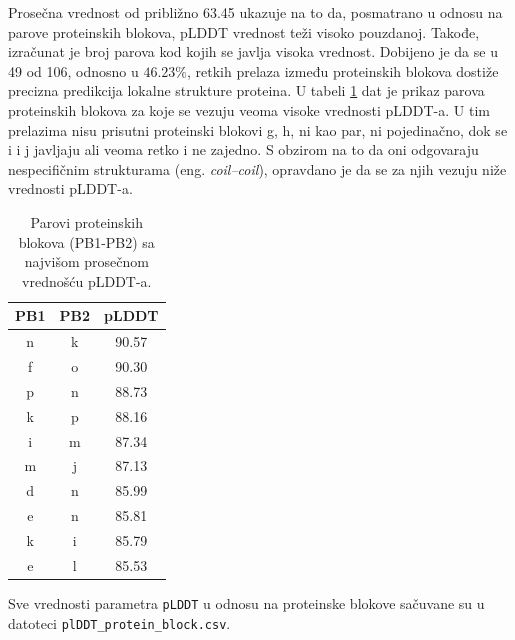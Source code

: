 \documentclass[a4paper,12pt]{article}
\begin{document}
Prosečna vrednost od približno 63.45 ukazuje na to da, posmatrano u odnosu na parove proteinskih blokova, pLDDT vrednost teži visoko pouzdanoj. Takođe, izračunat je broj parova kod kojih se javlja visoka vrednost. Dobijeno je da se u 49 od 106, odnosno u $46.23\%$, retkih prelaza između proteinskih blokova dostiže precizna predikcija lokalne strukture proteina. U tabeli \ref{Tabela:6} dat je prikaz parova proteinskih blokova za koje se vezuju veoma visoke vrednosti pLDDT-a. U tim prelazima nisu prisutni proteinski blokovi g, h, ni kao par, ni pojedinačno, dok se i i j javljaju ali veoma retko i ne zajedno. S obzirom na to da oni odgovaraju nespecifičnim strukturama (eng. \textit{coil–coil}), opravdano je da se za njih vezuju niže vrednosti pLDDT-a.
\begin{table}[h!]
\centering
\begin{tabular}{|c|c|c|}
\hline
\textbf{PB1} & \textbf{PB2} & \textbf{pLDDT} \\
\hline
n & k & 90.57 \\
\hline
f & o & 90.30 \\
\hline
p & n & 88.73 \\
\hline
k & p & 88.16 \\
\hline
i & m & 87.34 \\
\hline
m & j & 87.13 \\
\hline
d & n & 85.99 \\
\hline
e & n & 85.81 \\
\hline
k & i & 85.79 \\
\hline
e & l & 85.53 \\
\hline
\end{tabular}
\caption{Parovi proteinskih blokova (PB1-PB2) sa najvišom prosečnom vrednošću pLDDT-a.}
\label{Tabela:6}
\end{table}

Sve vrednosti parametra \texttt{pLDDT} u odnosu na proteinske blokove sačuvane su u datoteci \texttt{plDDT\_protein\_block.csv}.
\end{document}
